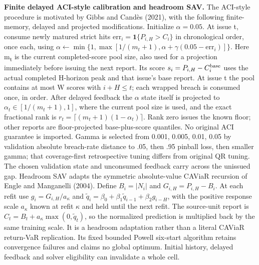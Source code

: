 \documentclass[11pt,a4paper]{article}
\begin{document}
\textbf{Finite delayed ACI-style calibration and headroom SAV.} The ACI-style procedure is motivated by Gibbs and Candès (2021), with the following finite-memory, delayed and projected modifications. Initialize \(\alpha=0.05\). At issue t, consume newly matured strict hits \(\mathrm{err}_i=\mathbf1\{P_{i,H}>C_i\}\) in chronological order, once each, using \(\alpha\leftarrow\min\{1,\max[1/(m_t+1),\alpha+\gamma(0.05-\mathrm{err}_i)]\}\). Here m\textsubscript{t} is the current completed-score pool size, also used for a projection immediately before issuing the next report. Its score \(s_i=P_{i,H}-C_i^{\rm base}\) uses the actual completed H-horizon peak and that issue's base report. At issue t the pool contains at most W scores with \(i+H\le t\); each wrapped breach is consumed once, in order. After delayed feedback the \(\alpha\) state itself is projected to \(\alpha_t\in[1/(m_t+1),1]\), where the current pool size is used, and the exact fractional rank is \(r_t=\lceil(m_t+1)(1-\alpha_t)\rceil\). Rank zero issues the known floor; other reports are floor-projected base-plus-score quantiles. No original ACI guarantee is imported. Gamma is selected from 0.001, 0.005, 0.01, 0.05 by validation absolute breach-rate distance to .05, then .95 pinball loss, then smaller gamma; that coverage-first retrospective tuning differs from original QR tuning. The chosen validation state and unconsumed feedback carry across the unissued gap. Headroom SAV adapts the symmetric absolute-value CAViaR recursion of Engle and Manganelli (2004). Define \(B_i=|N_i|\) and \(G_{i,H}=P_{i,H}-B_i\). At each refit use \(g_i=G_{i,H}/a_\kappa\) and \(\widetilde q_i=\beta_0+\beta_1\widetilde q_{i-1}+\beta_2 g_{i-H}\), with the positive response scale \(a_\kappa\) known at refit \(\kappa\) and held until the next refit. The source-unit report is \(C_t=B_t+a_\kappa\max(0,\widetilde q_t)\), so the normalized prediction is multiplied back by the same training scale. It is a headroom adaptation rather than a literal CAViaR return-VaR replication. Its fixed bounded Powell six-start algorithm retains convergence failures and claims no global optimum. Initial history, delayed feedback and solver eligibility can invalidate a whole cell.
\end{document}
